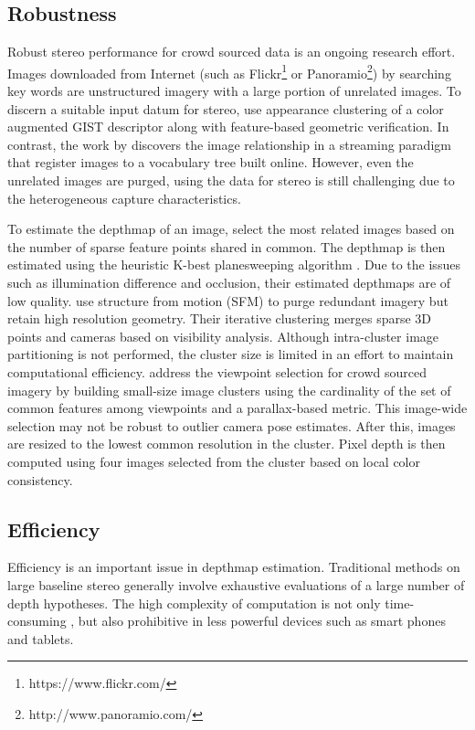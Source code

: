 \subsection{Robustness}
Robust stereo performance for crowd sourced data is an ongoing research effort.
Images downloaded from Internet (such as Flickr\footnote{https://www.flickr.com/} or Panoramio\footnote{http://www.panoramio.com/}) by searching key words are unstructured imagery with a large portion of unrelated images. To discern a suitable input datum for stereo, \citet{Frahm2010} use appearance clustering of a color augmented GIST descriptor \cite{oliva2001modeling} along with feature-based geometric verification. In contrast, the work by \citet{Heinly} discovers the image relationship in a streaming paradigm that register images to a vocabulary tree built online. However, even the unrelated images are purged, using the data for stereo is still challenging due to the heterogeneous capture characteristics.

To estimate the depthmap of an image, \citet{Frahm2010} select the most related images based on the number of sparse feature points shared in common. The depthmap is then estimated using the heuristic K-best planesweeping algorithm  \cite{handle_occlusion2001}. Due to the issues such as illumination difference and occlusion, their estimated depthmaps are of low quality. 
\citet{InternetScaleMVS_CVPR2010} use structure from motion (SFM) to purge redundant imagery but retain high resolution geometry. Their iterative clustering merges sparse 3D points and cameras based on visibility analysis. Although intra-cluster image partitioning is not performed, the cluster size is limited in an effort to maintain computational efficiency. \citet{Goesele07} address the viewpoint selection for crowd sourced imagery by building small-size image clusters using the cardinality of the set of common features among viewpoints and a parallax-based metric. This image-wide selection may not be robust to outlier camera pose estimates. After this, images are resized to the lowest common resolution in the cluster. Pixel depth is then computed using four images selected from the cluster based on local color consistency.

\subsection{Efficiency}
Efficiency is an important issue in depthmap estimation. Traditional methods on large baseline stereo generally involve exhaustive evaluations of a large number of depth hypotheses. The high complexity of computation is not only time-consuming \cite{yang2003multi,CombinedDepthOutlier,Gallup07,LeastCommitment_3DIMPVT2012}, but also prohibitive in less powerful devices such as smart phones and tablets. 

